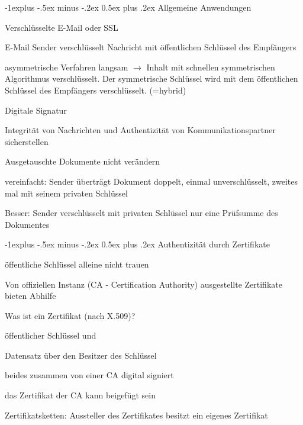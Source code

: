 \documentclass[a4paper, 8pt]{article}
\makeatletter
\renewcommand{\subsection}{\@startsection{subsection}{2}{0mm}%
                                {-1explus -.5ex minus -.2ex}%
                                {0.5ex plus .2ex}%
                                {\normalfont\normalsize\bfseries}}
\makeatother
\begin{document}
\begin{multicols*}{2}
  \subsection{Allgemeine Anwendungen}
  \begin{itemize*}
    \item Verschlüsselte E-Mail oder SSL
    \begin{itemize*}
      \item E-Mail Sender verschlüsselt Nachricht mit öffentlichen Schlüssel des Empfängers
      \item asymmetrische Verfahren langsam $\rightarrow$ Inhalt mit schnellen symmetrischen Algorithmus verschlüsselt. Der symmetrische Schlüssel wird mit dem öffentlichen Schlüssel des Empfängers verschlüsselt. (=hybrid)
    \end{itemize*}
    \item Digitale Signatur
    \begin{itemize*}
      \item Integrität von Nachrichten und Authentizität von Kommunikationspartner sicherstellen
      \item Ausgetauschte Dokumente nicht verändern
      \item vereinfacht: Sender überträgt Dokument doppelt, einmal unverschlüsselt, zweites mal mit seinem privaten Schlüssel
      \item Besser: Sender verschlüsselt mit privaten Schlüssel nur eine Prüfsumme des Dokumentes
    \end{itemize*}
  \end{itemize*}

  \subsection{Authentizität durch Zertifikate}
  \begin{itemize*}
    \item öffentliche Schlüssel alleine nicht trauen
    \item Von offiziellen Instanz (CA - Certification Authority) ausgestellte Zertifikate bieten Abhilfe
    \item Was ist ein Zertifikat (nach X.509)?
    \begin{itemize*}
      \item öffentlicher Schlüssel und
      \item Datensatz über den Besitzer des Schlüssel
      \item beides zusammen von einer CA digital signiert
      \item das Zertifikat der CA kann beigefügt sein
    \end{itemize*}
    \item Zertifikatsketten: Aussteller des Zertifikates besitzt ein eigenes Zertifikat
  \end{itemize*}


\end{multicols*}
\end{document}
